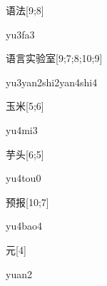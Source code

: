 \begin{verbete}[yu3fa3]{语法}[9;8]
\begin{pronuncia}{yu3fa3}
\end{pronuncia}
\end{verbete}

\begin{verbete}{语言实验室}[9;7;8;10;9]
\begin{pronuncia}[\\]{yu3yan2shi2yan4shi4}
\end{pronuncia}
\end{verbete}

\begin{verbete}[yu4mi3]{玉米}[5;6]                                                                                        
\begin{pronuncia}{yu4mi3}                                                                                                      
\end{pronuncia}                                                                                                                     
\end{verbete}                                                                                                                       

\begin{verbete}[yu4tou0]{芋头}[6;5]
\begin{pronuncia}{yu4tou0}
\end{pronuncia}
\end{verbete}

\begin{verbete}[yu4bao4]{预报}[10;7]
\begin{pronuncia}{yu4bao4}
\end{pronuncia}
\end{verbete}

\begin{verbete}[yuan2]{元}[4]
\begin{pronuncia}{yuan2}
\end{pronuncia}
\end{verbete}

